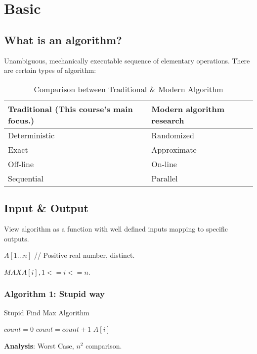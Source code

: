 \section{Basic}
\subsection{What is an algorithm?}
Unambiguous, mechanically executable sequence of elementary operations.
There are certain types of algorithm:

\begin{table}[H]
\caption{Comparison between Traditional \& Modern Algorithm}
\centering
\begin{tabular}{ ll }
Traditional (This course’s main focus.) & Modern algorithm research\\
\hline
Deterministic & Randomized \\
Exact & Approximate\\
Off-line & On-line\\
Sequential & Parallel\\
\end{tabular}
\end{table}

\subsection{Input \& Output}

View algorithm as a function with well defined inputs mapping to specific
outputs.

\AlgoInput $A[1...n]$  // Positive real number, distinct.

\AlgoOutput $MAX A[i], 1<= i <= n$.

\subsubsection{Algorithm 1: Stupid way}
\begin{algorithm}[H]
\caption{Stupid Find Max Algorithm}\label{Stupid_Find_Max_Algorithm}
\begin{algorithmic}[1]
  \State $count = 0$
      \State $count = count + 1$
    \EndIf
  \EndFor
    \Return $A[i]$
  \EndIf
\EndFor
\EndProcedure
\end{algorithmic}
\end{algorithm}

\textbf{Analysis}: Worst Case, $n^2$ comparison.

